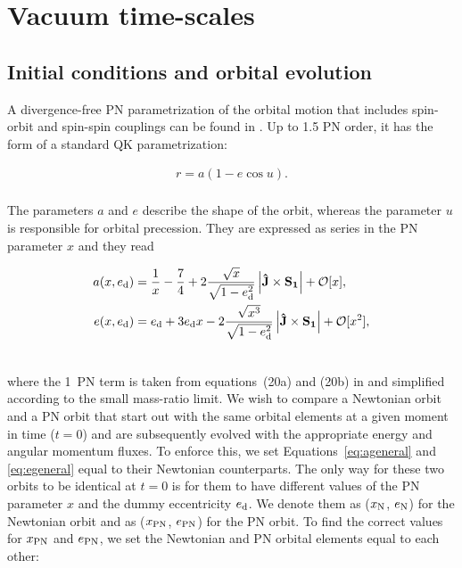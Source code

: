 \documentclass[usenatbib]{mnras}
\begin{document}

\section{Vacuum time-scales}\label{sec:firstorder}

\subsection{Initial conditions and orbital evolution}

A divergence-free PN parametrization of the orbital motion that includes spin-orbit and spin-spin couplings can be found in \citet{jetzer}. Up to 1.5 PN order, it has the form of a standard QK parametrization:

\begin{align}
    r = a\left(1-e \cos{u} \right).
    \label{eq:spinparam}\\ \nonumber
\end{align}

The parameters $a$ and $e$ describe the shape of the orbit, whereas the parameter $u$ is responsible for orbital precession. They are expressed as series in the PN parameter $x$ and they read

\begin{align}
    a(x,e_{\rm d})&= \frac{1}{x} -\frac{7}{4} + 2\frac{\sqrt{x}}{\sqrt{1-e_{\rm d}^2}} \left\lvert \mathbf{\hat{J} \times S_1} \right\rvert + \mathcal{O}[x], \label{eq:ageneral}\\
    e(x,e_{\rm d})&= e_{\rm d} + 3 e_{\rm d} x - 2\frac{\sqrt{x^3}}{\sqrt{1-e_{\rm d}^2}} \left\lvert \mathbf{\hat{J} \times S_1} \right\rvert + \mathcal{O}[x^2], \label{eq:egeneral}\\ \nonumber
\end{align}

\noindent where the 1~PN term is taken from equations~(20a) and (20b) in \cite{Memmesheimer} and simplified according to the small mass-ratio limit. We wish to compare a Newtonian orbit and a PN orbit that  start out with the same orbital elements at a given moment in time ($t=0$) and are subsequently evolved with the appropriate energy and angular momentum fluxes. To enforce this, we set Equations~\eqref{eq:ageneral} and \eqref{eq:egeneral} equal to their Newtonian counterparts. The only way for these two orbits to be identical at $t=0$ is for them to have different values of the PN parameter $x$ and the dummy eccentricity $e_{\rm d}$. We denote them as ($x_{\rm N}$, $e_{\rm N}$) for the Newtonian orbit and as ($x_{\rm{PN}}$, $e_{\rm{PN}}$) for the PN orbit. To find the correct values for $x_{\rm{PN}}$ and $e_{\rm{PN}}$, we set the Newtonian and PN orbital elements equal to each other:
\end{document}
